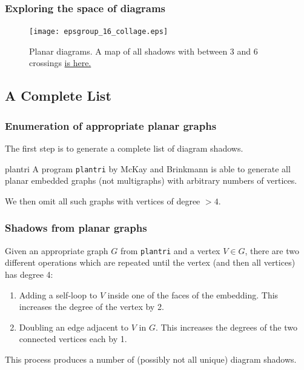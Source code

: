 \documentclass[presentation]{beamer}
\begin{document}
\begin{frame}
  \frametitle{Exploring the space of diagrams}
  \begin{figure}
    \centering
    \texttt{[image: epsgroup\_16\_collage.eps]}
    \caption{Planar diagrams. A map of all shadows with between 3 and
      6 crossings \href{http://prezi.com/s5te-8obcfgq/?utm_campaign=share&utm_medium=copy&rc=ex0share}{is here.}}
    \label{fig:planarcollage16}
  \end{figure}
\end{frame}


\subsection{A Complete List}

\begin{frame}
  \frametitle{Enumeration of appropriate planar graphs}
  The first step is to generate a complete list of diagram shadows.

  \begin{block}{plantri}
    A program \texttt{plantri} by McKay and Brinkmann is able to
    generate all planar embedded graphs (not multigraphs) with
    arbitrary numbers of vertices.
  \end{block}
  We then omit all such graphs with vertices of degree $> 4$.
\end{frame}

\begin{frame}
  \frametitle{Shadows from planar graphs}
  Given an appropriate graph $G$ from \texttt{plantri} and a vertex $V
  \in G$, there are two
  different operations which are repeated until the vertex (and then
  all vertices) has degree 4:

  \begin{enumerate}
  \item Adding a self-loop to $V$ inside one of the faces of the
    embedding. This increases the degree of the vertex by 2.
  \item Doubling an edge adjacent to $V$ in $G$. This increases the
    degrees of the two connected vertices each by 1.
  \end{enumerate}

  This process produces a number of (possibly not all unique) diagram
  shadows.
\end{frame}
\end{document}

